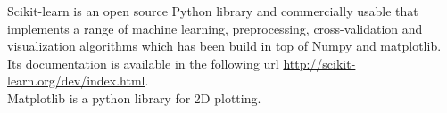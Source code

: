 Scikit-learn is an open source Python library and commercially usable that implements a range of machine learning, preprocessing, cross-validation and visualization algorithms which has been build in top of Numpy and matplotlib. Its documentation is available in the following url \url{http://scikit-learn.org/dev/index.html}.\\

Matplotlib is a python library for 2D plotting.
